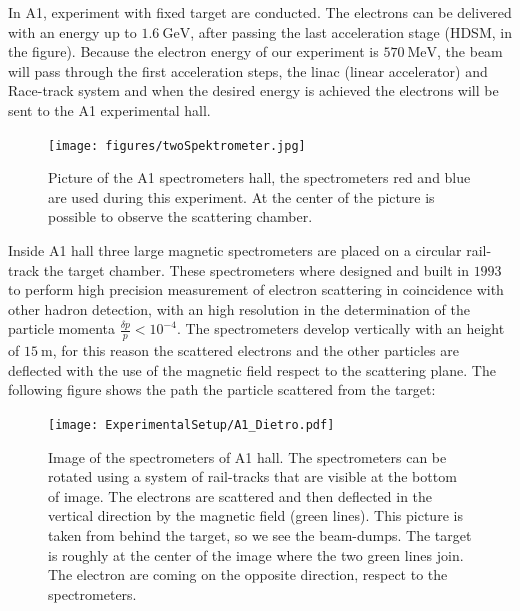 In A1, experiment with fixed target are conducted. The electrons can be delivered with an energy up to $\SI{1.6}{\giga \electronvolt}$, after passing the last acceleration stage (HDSM, in the figure). Because the electron energy of our experiment is $\SI{570}{\mega \electronvolt}$, the beam will pass through the first acceleration steps, the linac (linear accelerator) and Race-track system and when the desired energy is achieved the electrons will be sent to the A1 experimental hall. 

\begin{figure}[hbtp]
\centering
\texttt{[image: figures/twoSpektrometer.jpg]}
\caption{Picture of the A1 spectrometers hall, the spectrometers red and blue are used during this experiment. At the center of the picture is possible to observe the scattering chamber.}
\end{figure}


Inside A1 hall three large magnetic spectrometers are placed on a circular rail-track the target chamber. These spectrometers where designed and built in $1993$ to perform high precision measurement of electron scattering in coincidence with other hadron detection, with an high resolution in the determination of the particle momenta $\frac{\delta p}{p} < 10^{-4}$. The spectrometers develop vertically with an height of $\SI{15}{\meter}$, for this reason the scattered electrons and the other particles are deflected with the use of the magnetic field respect to the scattering plane. The following figure shows the path the particle scattered from the target:

\begin{figure}
\centering
\caption{Image of the spectrometers of A1 hall. The spectrometers can be rotated using a system of rail-tracks that are visible at the bottom of image. The electrons are scattered and then deflected in the vertical direction by the magnetic field (green lines). This picture is taken from behind the target, so we see the beam-dumps. The target is roughly at the center of the image where the two green lines join. The electron are coming on the opposite direction, respect to the spectrometers.}\label{fig:TwoDetectors}
\texttt{[image: ExperimentalSetup/A1\_Dietro.pdf]}
\end{figure}


